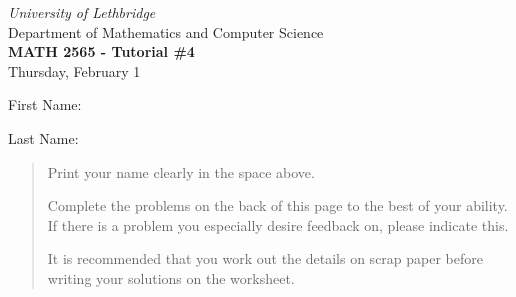 \documentclass[12pt]{article}
\newcommand{\skipline}{\vspace{12pt}}
\begin{document}
\author{Instructor: Sean Fitzpatrick}
\thispagestyle{empty}
\begin{center}
\emph{University of Lethbridge}\\
Department of Mathematics and Computer Science\\
{\bf MATH 2565 - Tutorial \#4}\\
Thursday, February 1
\end{center}
\skipline \skipline \skipline \noindent \skipline

\skipline
First Name:\underline{\hspace{348pt}}\\
\skipline

\vspace{1cm}

Last Name:\underline{\hspace{351pt}}



\vspace{1cm}

\begin{quote}
Print your name clearly in the space above. 

\medskip

Complete the problems on the back of this page to the best of your ability. If there is a problem you especially desire feedback on, please indicate this. 

\medskip

It is recommended that you work out the details on scrap paper before writing your solutions on the worksheet.
\end{quote}

\end{document}
